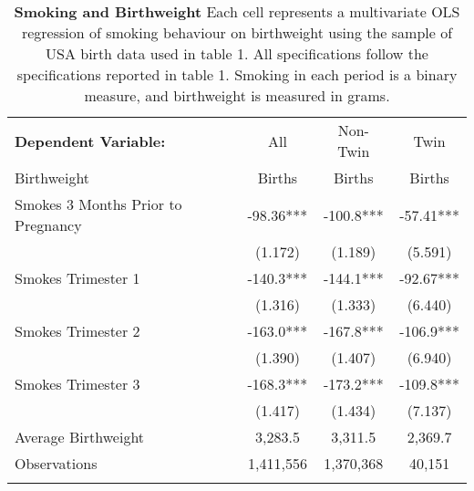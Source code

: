 \documentclass{nature}
\begin{document}
\begin{linenumbers}
\begin{spacing}{1}


\begin{table}
  \begin{center}
    \begin{tabular}{lccc}
      \toprule
      \textbf{Dependent Variable:}      & All & Non-Twin & Twin \\
      Birthweight      & Births & Births & Births \\
      \midrule
      Smokes 3 Months Prior to Pregnancy & -98.36*** & -100.8*** & -57.41*** \\
      & (1.172) & (1.189) &  (5.591) \\
      Smokes Trimester 1 & -140.3*** & -144.1*** & -92.67*** \\
      & (1.316) & (1.333) & (6.440) \\
      Smokes Trimester 2 & -163.0*** & -167.8*** & -106.9*** \\
      & (1.390) & (1.407) & (6.940) \\
      Smokes Trimester 3 & -168.3*** & -173.2*** & -109.8*** \\
      & (1.417) & (1.434) & (7.137) \\
      \midrule
      Average Birthweight & 3,283.5   & 3,311.5   & 2,369.7 \\
      Observations        & 1,411,556 & 1,370,368 & 40,151  \\
      \bottomrule
      \caption{\textbf{Smoking and Birthweight} {\footnotesize Each cell represents a multivariate OLS regression of smoking behaviour on birthweight using the sample of USA birth data used in table 1.  All specifications follow the specifications reported in table 1.  Smoking in each period is a binary measure, and birthweight is measured in grams.}}
    \end{tabular}
  \end{center}
\end{table}








\end{spacing}
\end{linenumbers}
\end{document}
